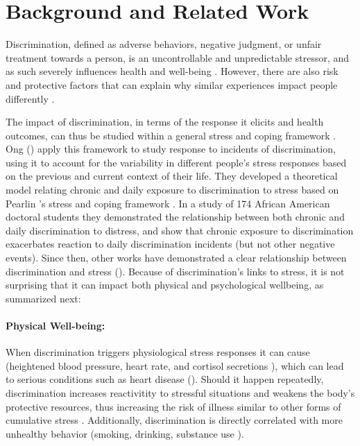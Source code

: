 \section{Background and Related Work}
\label{sec:back}

\label{sec:back-discrimination}
\noindent 
Discrimination, defined as adverse behaviors, negative judgment, or unfair treatment towards a person, is an uncontrollable and unpredictable stressor, and as such severely influences health and well-being \citep{Williams:2009}. However, there are also risk and protective factors that can explain why similar experiences impact people differently \citep{SeridoAlmeidaWethington:2004}.

The impact of discrimination, in terms of the response it elicits and  health outcomes, can thus be studied within a general stress and coping framework \citep{Pearlin:1999}. 
Ong \etal (\citeyear{Ong:2009}) apply this framework to  study  response to incidents of discrimination, using it to account for the variability in different people's stress responses based on the previous and current context of their life. They developed a theoretical model relating chronic and daily exposure to discrimination to stress based on Pearlin \etal's stress and coping framework \citep{Pearlin:1999}. In a  study of  174 African American doctoral students they demonstrated the relationship between both chronic and daily discrimination to distress, and show that chronic exposure to discrimination exacerbates reaction to daily discrimination incidents (but not other negative events). Since then, other works have demonstrated a clear relationship between discrimination and stress (\eg \cite{Pieterse:2007}). 
Because of discrimination's links to stress, it is not surprising that it can impact both physical and psychological wellbeing, as summarized next:

\paragraph{Physical Well-being:}
\label{sec:back-discrimination-physical}
When discrimination triggers physiological stress responses it can cause
(\eg heightened blood pressure, heart rate, and cortisol secretions \citep{Brondolo:2008, Steffen:2003, Smart:2010}), which can lead to serious conditions such as heart disease (\eg \cite{Marshall:1997, Cohen:1994}). Should it happen repeatedly, discrimination increases reactivitity to stressful situations \citep{GuyllMatthewsBrom-berger:2001} and weakens the body's protective resources, thus increasing the risk of illness similar to other forms of cumulative stress \citep{GeeSpencerChenTakeuchi:2007}. Additionally, discrimination is directly correlated with more unhealthy behavior (\eg smoking, drinking, substance use \citep{LandrineKlonoff:1996, MartinTuchRoman:2003}). 

